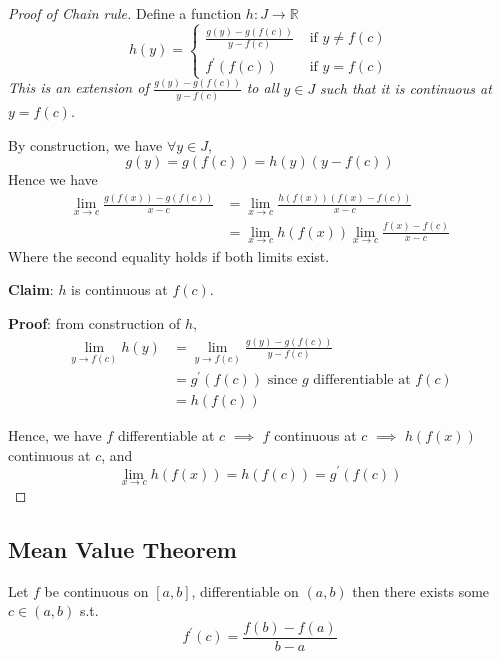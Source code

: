 \begin{proof}[Proof of Chain rule]
    Define a function $h: J \to \mathbb{R}$ 
    \[
        h(y) = \begin{cases}
            \frac{g(y) - g(f(c))}{y - f(c)} &\text{ if } y \neq f(c) \\
            f^{\prime}(f(c)) &\text{ if } y = f(c)
        \end{cases}
    \]
    \textit{This is an extension of } $ \frac{g(y) - g(f(c))}{y - f(c)}$
    \textit{to all } $ y \in J$ \textit{ such that it is continuous at $y = f(c)$}.
    \medskip

    By construction, we have $\forall y \in J$,
    \[
        g(y) = g(f(c)) = h(y) (y - f(c))
    \]
    Hence we have 
    \begin{align*}
        \lim_{x \to c} \frac{g(f(x)) - g(f(c))}{x - c} 
        &= \lim_{x \to c} \frac{h(f(x))(f(x) - f(c))}{x - c} \\
        &= \lim_{x \to c} h(f(x)) \lim_{x \to c} \frac{f(x) - f(c)}{x-c}
    \end{align*}
    Where the second equality holds if both limits exist.
    \medskip

    \textbf{Claim}: $h$ is continuous at $f(c)$.
    
    \textbf{Proof}: from construction of $h$, 
    \begin{align*}
        \lim_{y \to f(c)}h(y) 
        &= \lim_{y \to f(c)} \frac{g(y) - g(f(c))}{y - f(c)} \\
        &= g^{\prime}(f(c))  \text{ since $g$ differentiable at $f(c)$}
        \\
        &= h(f(c))
    \end{align*}

    Hence, we have $f$ differentiable at $c$ $\implies$
    $f$ continuous at $c$ $\implies$
    $h(f(x))$ continuous at $c$, and 
    \[
        \lim_{x \to c} h(f(x)) 
        = h(f(c)) = g^{\prime}(f(c))
    \]
\end{proof}

\subsection{Mean Value Theorem}

\begin{theorem}
    \label{thm:mvt}
    Let $f$ be continuous on $[a, b]$, differentiable on $(a, b)$
    then there exists some $c \in (a, b)$ s.t. 
    \[
        f^{\prime}(c) = \frac{f(b) - f(a)}{b-a}
    \]
\end{theorem}

